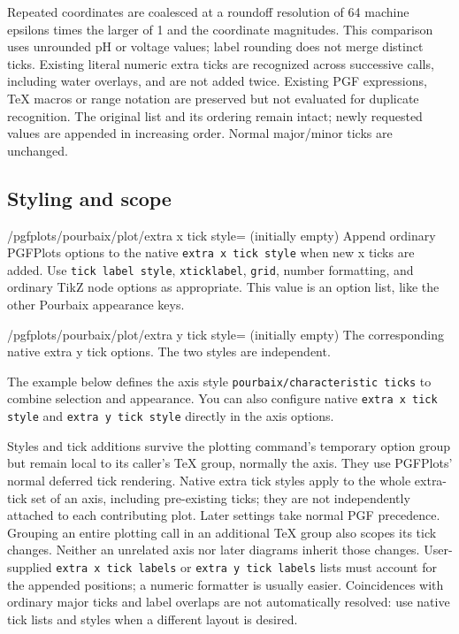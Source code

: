 \documentclass[a4paper,11pt]{ltxdoc}
\begin{document}
Repeated coordinates are coalesced at a roundoff resolution of 64 machine
epsilons times the larger of 1 and the coordinate magnitudes. This comparison
uses unrounded pH or voltage values; label rounding does not merge distinct ticks.
Existing literal numeric extra ticks are recognized across successive calls,
including water overlays, and are not added twice. Existing PGF expressions,
TeX macros or range notation are preserved but not evaluated for duplicate
recognition. The original list and its ordering remain intact; newly requested
values are appended in increasing order. Normal major/minor ticks are unchanged.

\subsection{Styling and scope}
\begin{key}{/pgfplots/pourbaix/plot/extra x tick style= (initially empty)}
Append ordinary PGFPlots options to the native \texttt{extra x tick style} when
new x ticks are added. Use \texttt{tick label style}, \texttt{xticklabel},
\texttt{grid}, number formatting, and ordinary TikZ node options as appropriate.
This value is an option list, like the other Pourbaix appearance keys.
\end{key}
\begin{key}{/pgfplots/pourbaix/plot/extra y tick style= (initially empty)}
The corresponding native extra y tick options. The two styles are independent.
\end{key}
The example below defines the axis style
\texttt{pourbaix/characteristic ticks} to combine selection and appearance.
You can also configure native \texttt{extra x tick style} and
\texttt{extra y tick style} directly in the axis options.

Styles and tick additions survive the plotting command's temporary option group
but remain local to its caller's TeX group, normally the axis. They use PGFPlots'
normal deferred tick rendering. Native extra tick styles apply to the whole
extra-tick set of an axis, including pre-existing ticks; they are not independently
attached to each contributing plot. Later settings take normal PGF precedence.
Grouping an entire plotting call in an additional TeX group also scopes its tick
changes. Neither an unrelated axis nor later diagrams inherit those changes.
User-supplied \texttt{extra x tick labels} or \texttt{extra y tick labels} lists
must account for the appended positions; a numeric formatter is usually easier.
Coincidences with ordinary major ticks and label overlaps are not automatically
resolved: use native tick lists and styles when a different layout is desired.
\end{document}
